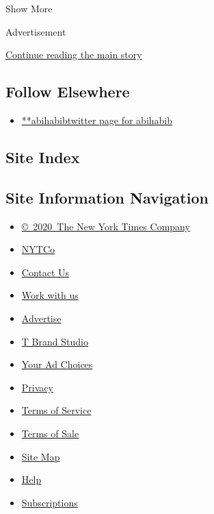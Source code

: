 Show More

Advertisement

\protect\hyperlink{after-mid2}{Continue reading the main story}

\hypertarget{follow-elsewhere}{%
\subsection{Follow Elsewhere}\label{follow-elsewhere}}

\begin{itemize}
\tightlist
\item
  \href{https://twitter.com/abihabib}{**abihabibtwitter page for
  abihabib}
\end{itemize}

\hypertarget{site-index}{%
\subsection{Site Index}\label{site-index}}

\hypertarget{site-information-navigation}{%
\subsection{Site Information
Navigation}\label{site-information-navigation}}

\begin{itemize}
\tightlist
\item
  \href{https://help.nytimes3xbfgragh.onion/hc/en-us/articles/115014792127-Copyright-notice}{©~2020~The
  New York Times Company}
\end{itemize}

\begin{itemize}
\tightlist
\item
  \href{https://www.nytco.com/}{NYTCo}
\item
  \href{https://help.nytimes3xbfgragh.onion/hc/en-us/articles/115015385887-Contact-Us}{Contact
  Us}
\item
  \href{https://www.nytco.com/careers/}{Work with us}
\item
  \href{https://nytmediakit.com/}{Advertise}
\item
  \href{http://www.tbrandstudio.com/}{T Brand Studio}
\item
  \href{https://www.nytimes3xbfgragh.onion/privacy/cookie-policy\#how-do-i-manage-trackers}{Your
  Ad Choices}
\item
  \href{https://www.nytimes3xbfgragh.onion/privacy}{Privacy}
\item
  \href{https://help.nytimes3xbfgragh.onion/hc/en-us/articles/115014893428-Terms-of-service}{Terms
  of Service}
\item
  \href{https://help.nytimes3xbfgragh.onion/hc/en-us/articles/115014893968-Terms-of-sale}{Terms
  of Sale}
\item
  \href{https://spiderbites.nytimes3xbfgragh.onion}{Site Map}
\item
  \href{https://help.nytimes3xbfgragh.onion/hc/en-us}{Help}
\item
  \href{https://www.nytimes3xbfgragh.onion/subscription?campaignId=37WXW}{Subscriptions}
\end{itemize}

